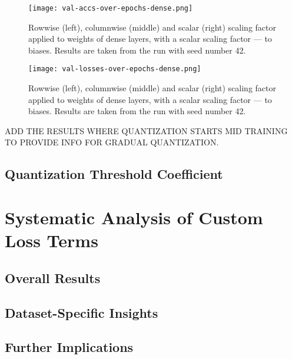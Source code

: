 \begin{figure}[h!]
  \centering
  \texttt{[image: val-accs-over-epochs-dense.png]}
  \caption{Rowwise (left), columnwise (middle) and scalar (right) scaling factor applied to weights of dense layers, with a scalar scaling factor — to biases. Results are taken from the run with seed number 42.}
  \label{fig:val-accs-over-epochs-dense}
\end{figure}

\begin{figure}[h!]
  \centering
  \texttt{[image: val-losses-over-epochs-dense.png]}
  \caption{Rowwise (left), columnwise (middle) and scalar (right) scaling factor applied to weights of dense layers, with a scalar scaling factor — to biases. Results are taken from the run with seed number 42.}
  \label{fig:val-losses-over-epochs-dense}
\end{figure}
  
ADD THE RESULTS WHERE QUANTIZATION STARTS MID TRAINING TO PROVIDE INFO FOR GRADUAL QUANTIZATION. 

\subsection{Quantization Threshold Coefficient}
\label{subsec:penalty rate}


\section{Systematic Analysis of Custom Loss Terms}
\label{sec:dataset}

\subsection{Overall Results}
\label{subsec:overallresults}

\subsection{Dataset-Specific Insights}
\label{subsec:cifat10}

\subsection{Further Implications}
\label{subsec:imagenette}


